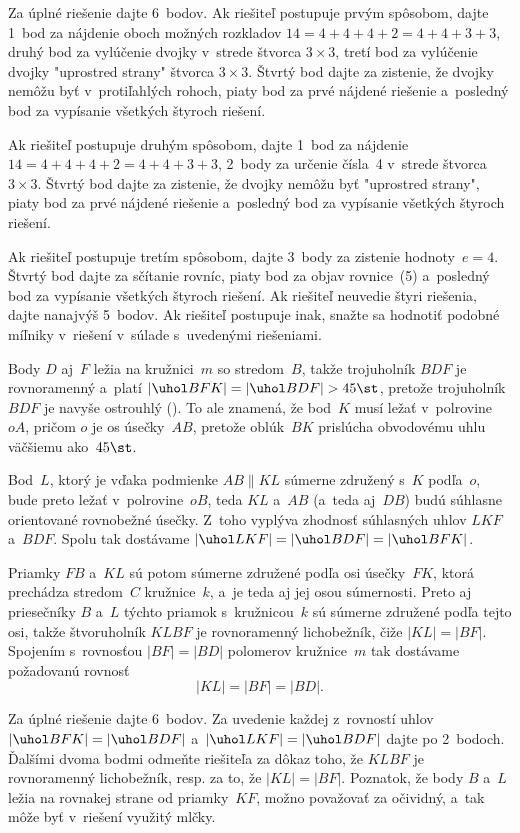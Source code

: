 {\nobreak\medskip\petit\noindent
Za úplné riešenie dajte 6~bodov.
Ak riešiteľ postupuje prvým spôsobom, dajte 1~bod za nájdenie oboch možných rozkladov
$14 = 4+4+4+2 = 4+4+3+3$, druhý bod za vylúčenie dvojky v~strede štvorca
$3 \times 3$, tretí bod za vylúčenie dvojky "uprostred strany" štvorca
$3 \times 3$. Štvrtý bod dajte za zistenie, že dvojky nemôžu byť
v~protiľahlých rohoch, piaty bod za prvé nájdené riešenie a~posledný bod
za vypísanie všetkých štyroch riešení.

Ak riešiteľ postupuje druhým spôsobom, dajte 1~bod za nájdenie
$14 = 4+4+4+2 = 4+4+3+3$, 2~body za určenie čísla~4 v~strede štvorca $3 \times3$.
Štvrtý bod dajte za zistenie, že dvojky nemôžu byť "uprostred
strany", piaty bod za prvé nájdené riešenie a~posledný bod za vypísanie
všetkých štyroch riešení.

Ak riešiteľ postupuje tretím spôsobom, dajte
3~body za zistenie hodnoty~$e=4$.
Štvrtý bod dajte za sčítanie rovníc, piaty bod za objav
rovnice~(5) a~posledný bod za vypísanie všetkých štyroch
riešení. Ak riešiteľ neuvedie štyri riešenia, dajte nanajvýš 5~bodov.
Ak riešiteľ postupuje inak, snažte sa hodnotiť podobné míľniky
v~riešení v~súlade s~uvedenými riešeniami.

\endpetit
\bigbreak}

{%
Body $D$ aj~$F$ ležia na kružnici~$m$ so stredom~$B$, takže
trojuholník $BDF$ je rovnoramenný a~platí $|\uhol BFK| = |\uhol BDF|>45\st$,
pretože trojuholník $BDF$ je navyše ostrouhlý (\obr). To ale znamená, že
bod~$K$ musí ležať v~polrovine $oA$, pričom $o$ je os úsečky~$AB$,
pretože oblúk~$BK$ prislúcha obvodovému uhlu väčšiemu ako~$45\st$.

Bod~$L$, ktorý je vďaka podmienke $AB\parallel KL$ súmerne združený s~$K$ podľa~$o$,
bude preto ležať v~polrovine~$oB$, teda $KL$ a~$AB$ (a~teda aj~$DB$)
budú súhlasne orientované rovnobežné úsečky. Z~toho vyplýva
zhodnosť súhlasných uhlov $LKF$ a~$BDF$. Spolu tak dostávame
$|\uhol LKF| = |\uhol BDF|=|\uhol BFK|$.
%

Priamky $FB$ a~$KL$ sú potom súmerne združené podľa osi úsečky~$FK$, ktorá
prechádza stredom~$C$ kružnice~$k$, a~je teda aj jej osou súmernosti. Preto
aj priesečníky $B$ a~$L$ týchto priamok s~kružnicou~$k$ sú
súmerne združené podľa tejto osi, takže štvoruholník $KLBF$ je rovnoramenný
lichobežník, čiže $|KL| = |BF|$. Spojením s~rovnosťou $|BF| = |BD|$
polomerov kružnice~$m$ tak dostávame požadovanú rovnosť
$$
|KL| = |BF| = |BD|.
$$


\nobreak\medskip\petit\noindent
Za úplné riešenie dajte 6~bodov.
Za uvedenie každej z~rovností uhlov $|\uhol BFK| = |\uhol BDF|$
a~$|\uhol LKF| = |\uhol BDF|$ dajte po 2~bodoch. Ďalšími dvoma bodmi odmeňte
riešiteľa za dôkaz toho, že $KLBF$ je rovnoramenný lichobežník, resp.
za to, že $|KL| = |BF|$.
Poznatok, že body $B$ a~$L$ ležia na rovnakej strane od priamky~$KF$,
možno považovať za očividný, a~tak môže byť v~riešení využitý mlčky.
\endpetit
\bigbreak
}

